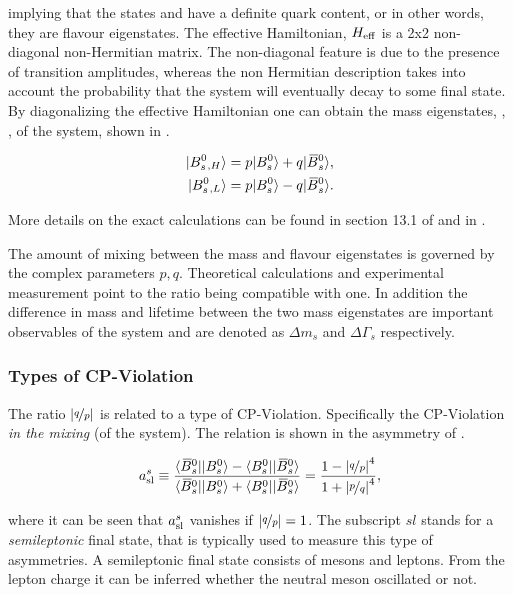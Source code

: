 \noindent implying that the states \Bs and \Bsb have a definite quark content, or in other words,
they are flavour eigenstates. The effective Hamiltonian, $H_{\rm eff}$ is a 2x2 non-diagonal non-Hermitian matrix.
The non-diagonal feature is due to the presence of \BBbarSyst transition amplitudes,
whereas the non Hermitian description takes into account the probability that the system will
eventually decay to some final state. By diagonalizing the effective Hamiltonian one can obtain
the mass eigenstates, , , of the system, shown in .

\begin{align}
  \centering
  \ket{\Bs{}_{,H}} &= p \ket{\Bs} + q \ket{\Bsb}, \nonumber \\
  \ket{\Bs{}_{,L}} &= p \ket{\Bs} - q \ket{\Bsb}.
  \label{bs_mass_eigen}
\end{align}

More details on the exact calculations can be found in section 13.1 of\cite{PDG} and in \cite{jeroenThesis,DeBruyn-thesis}.

The amount of mixing between the mass and flavour eigenstates is governed by the complex parameters $p,q$.
Theoretical calculations \cite{Lenz:2011ti} and experimental measurement \cite{asl-paper} point to the ratio
\qoverp being compatible with one. In addition the difference in mass and lifetime between the two mass
eigenstates are important observables of the \BBbarSyst system and are denoted as $\Delta m_s$ and $\Delta\Gamma_s$ respectively.

\subsubsection{Types of CP-Violation}
The ratio $|\nicefrac{q}{p}|$ is related to a type of CP-Violation. Specifically the CP-Violation {\it in the mixing} (of the \BBbarSyst system).
The relation is shown in the asymmetry of .

\begin{equation}
  \centering
  a_{\rm sl}^{s}  \equiv \frac{\bra{\Bsb}\ket{\Bs} - \bra{\Bs}\ket{\Bsb}} {\bra{\Bsb}\ket{\Bs} + \bra{\Bs}\ket{\Bsb}}
                       = \frac{1 - \left|\nicefrac{q}{p}\right|^4}{1 + \left|\nicefrac{p}{q}\right|^4},
  \label{acp_mixing}
\end{equation}

\noindent where it can be seen that $a_{\rm sl}^{s}$ vanishes if $|\nicefrac{q}{p}|= 1$. The subscript $sl$ stands for a {\it semileptonic}
final state, that is typically used to measure this type of asymmetries. A semileptonic final state
consists of mesons and leptons. From the lepton charge it can be inferred whether the neutral meson oscillated or not.

